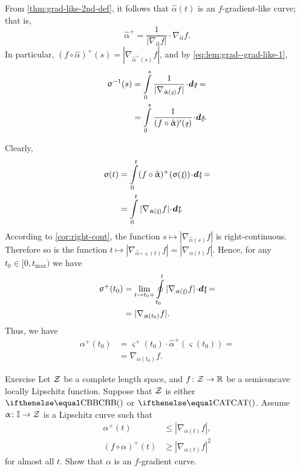 From \ref{thm:grad-like-2nd-def}, it follows that $\hat\alpha(t)$ is an $f$-gradient-like curve; 
that is,
\[\hat\alpha^+=\frac{1}{|\nabla_{\hat\alpha} f|}\cdot\nabla_{\hat\alpha} f.\]
In particular, $(f\circ\hat\alpha)^+(s)=|\nabla_{\hat\alpha^+(s)} f|$, and by \ref{eq:lem:grad--grad-like-1},
\begin{align*}\varsigma^{-1}(s)
&=\int\limits_0^s\frac{1}{|\nabla_{\hat\alpha(\under s)} f|}\cdot\dd\under s
=
\\
&=
\int\limits_0^s\frac{1}{(f\circ\hat\alpha)'(\under s)}\cdot\dd\under s.
\end{align*}
\medskip

Clearly,
\begin{align*}\varsigma(t)
&=
\int\limits_0^{t}(f\circ\hat\alpha)^+(\varsigma(\under t))\cdot\dd \under t
=
\\
&=
\int\limits_0^{t}|\nabla_{\alpha(\under t)}f|\cdot\dd \under t.
\end{align*}
According to \ref{cor:right-cont}, the function $s\mapsto|\nabla_{\hat\alpha(s)}f|$ is right-continuous.
Therefore so is the function $t\mapsto|\nabla_{\hat\alpha\circ\varsigma(t)}f|=|\nabla_{\alpha(t)}f|$.
Hence, for any $t_0\in[0,t_{\max})$ we have
\begin{align*}\varsigma^+(t_0)
&=
\lim_{t\to t_0+}
\oint\limits_{t_0}^t
|\nabla_{\alpha(\under t)}f|\cdot\dd\under t
=
\\
&=
|\nabla_{\alpha(t_0)}f|.
\end{align*}
Thus, we have 
\begin{align*}\alpha^+(t_0)
&=
\varsigma^+(t_0)\cdot\hat\alpha^+(\varsigma(t_0))
=
\\
&=
\nabla_{\alpha(t_0)} f.
\end{align*}
\qedsf


\begin{thm}{Exercise}\label{ex:grad-curve-condition}
Let $\mathcal{Z}$ be a complete length space, and 
$f\:\spc{Z}\to \RR$ be a semiconcave locally Lipschitz 
function.
Suppose that $\mathcal{Z}$ is either $\Alex{}$ or $\CAT{}$.
Assume $\alpha\:\II\to \spc{Z}$ is a Lipschitz curve such that 
\begin{align*}
\alpha^+(t)&\le|\nabla_{\alpha(t)}f|,
\\
(f\circ\alpha)^+(t)&\ge |\nabla_{\alpha(t)}f|^2
\end{align*}
for almost all $t$.
Show that $\alpha$ is an $f$-gradient curve.
\end{thm}



